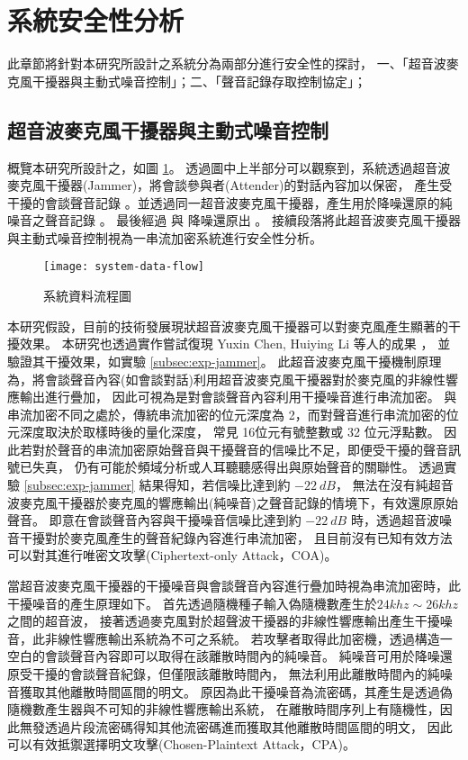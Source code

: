 \section{系統安全性分析}

    此章節將針對本研究所設計之系統分為兩部分進行安全性的探討，
一、「超音波麥克風干擾器與主動式噪音控制」；二、「聲音記錄存取控制協定」；

\subsection{超音波麥克風干擾器與主動式噪音控制}

    概覽本研究所設計之，如圖 \ref{fig:system-data-flow}。
透過圖中上半部分可以觀察到，系統透過超音波麥克風干擾器(Jammer)，將會談參與者(Attender)的對話內容加以保密，
產生受干擾的會談聲音記錄 \DEFrecJ。並透過同一超音波麥克風干擾器，產生用於降噪還原的純噪音之聲音記錄 \DEFrecN。
最後經過 \DEFfuncEstm{} 與 \DEFfuncAnc{} 降噪還原出 \DEFrecREV。
接續段落將此超音波麥克風干擾器與主動式噪音控制視為一串流加密系統進行安全性分析。

\begin{figure}[H]
    \centering
    \texttt{[image: system-data-flow]}
    \caption{系統資料流程圖}\label{fig:system-data-flow}
\end{figure}

    本研究假設，目前的技術發展現狀超音波麥克風干擾器可以對麥克風產生顯著的干擾效果\cite{chen2020demonstrating}。
本研究也透過實作嘗試復現 Yuxin Chen, Huiying Li 等人的成果 \cite{chen2020wearable}，
並驗證其干擾效果，如實驗 \ref{subsec:exp-jammer}。
此超音波麥克風干擾機制原理為，將會談聲音內容(如會談對話)利用超音波麥克風干擾器對於麥克風的非線性響應輸出進行疊加，
因此可視為是對會談聲音內容利用干擾噪音進行串流加密。
與串流加密不同之處於，傳統串流加密的位元深度為 2，而對聲音進行串流加密的位元深度取決於取樣時後的量化深度，
常見 16位元有號整數或 32 位元浮點數。
因此若對於聲音的串流加密原始聲音與干擾聲音的信噪比不足，即便受干擾的聲音訊號已失真，
仍有可能於頻域分析或人耳聽聽感得出與原始聲音的關聯性。
透過實驗 \ref{subsec:exp-jammer} 結果得知，若信噪比達到約 $-22~dB$，
無法在沒有純超音波麥克風干擾器於麥克風的響應輸出(純噪音)之聲音記錄的情境下，有效還原原始聲音。
即意在會談聲音內容與干擾噪音信噪比達到約 $-22~dB$ 時，透過超音波噪音干擾對於麥克風產生的聲音紀錄內容進行串流加密，
且目前沒有已知有效方法可以對其進行唯密文攻擊(Ciphertext-only Attack，COA)。

    當超音波麥克風干擾器的干擾噪音與會談聲音內容進行疊加時視為串流加密時，此干擾噪音的產生原理如下。
首先透過隨機種子輸入偽隨機數產生於$24khz\sim26khz$之間的超音波，
接著透過麥克風對於超聲波干擾器的非線性響應輸出產生干擾噪音，此非線性響應輸出系統為不可之系統。
若攻擊者取得此加密機，透過構造一空白的會談聲音內容即可以取得在該離散時間內的純噪音。
純噪音可用於降噪還原受干擾的會談聲音紀錄，但僅限該離散時間內，
無法利用此離散時間內的純噪音獲取其他離散時間區間的明文。
原因為此干擾噪音為流密碼，其產生是透過偽隨機數產生器與不可知的非線性響應輸出系統，
在離散時間序列上有隨機性，因此無發透過片段流密碼得知其他流密碼進而獲取其他離散時間區間的明文，
因此可以有效抵禦選擇明文攻擊(Chosen-Plaintext Attack，CPA)。

